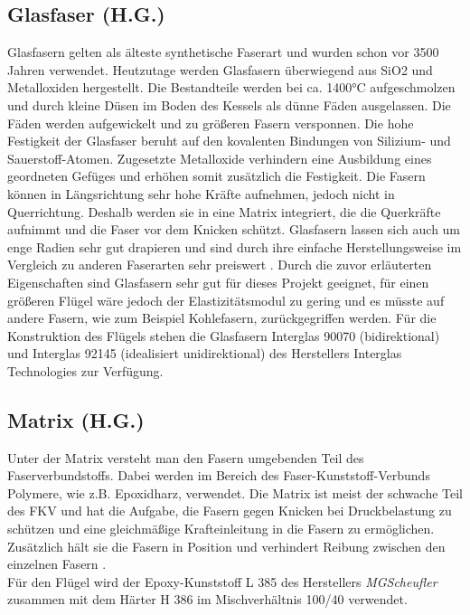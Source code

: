 \subsection{Glasfaser (H.G.)}
\label{Glasfaser}
Glasfasern gelten als älteste synthetische Faserart und wurden schon vor 3500 Jahren verwendet. Heutzutage werden Glasfasern überwiegend aus SiO2 und Metalloxiden hergestellt. Die Bestandteile werden bei ca. 1400°C aufgeschmolzen und durch kleine Düsen im Boden des Kessels als dünne Fäden ausgelassen. Die Fäden werden aufgewickelt und zu größeren Fasern versponnen\cite{item3}.
Die hohe Festigkeit der Glasfaser beruht auf den kovalenten Bindungen von Silizium- und Sauerstoff-Atomen. Zugesetzte Metalloxide verhindern eine Ausbildung eines geordneten Gefüges und erhöhen somit zusätzlich die Festigkeit. Die Fasern können in Längsrichtung sehr hohe Kräfte aufnehmen, jedoch nicht in Querrichtung. Deshalb werden sie in eine Matrix integriert, die die Querkräfte aufnimmt und die Faser vor dem Knicken schützt. Glasfasern lassen sich auch um enge Radien sehr gut drapieren und sind durch ihre einfache Herstellungsweise im Vergleich zu anderen Faserarten sehr preiswert \cite{item4}.
Durch die zuvor erläuterten Eigenschaften sind Glasfasern sehr gut für dieses Projekt geeignet, für einen größeren Flügel wäre jedoch der Elastizitätsmodul zu gering und es müsste auf andere Fasern, wie zum Beispiel Kohlefasern, zurückgegriffen werden. 
Für die Konstruktion des Flügels stehen die Glasfasern Interglas 90070 (bidirektional) und Interglas 92145 (idealisiert unidirektional) des Herstellers Interglas Technologies zur Verfügung. 

\subsection{Matrix (H.G.)}
Unter der Matrix versteht man den Fasern umgebenden Teil des Faserverbundstoffs. Dabei werden im Bereich des Faser-Kunststoff-Verbunds Polymere, wie z.B. Epoxidharz, verwendet. Die Matrix ist meist der schwache Teil des FKV und hat die Aufgabe, die Fasern gegen Knicken bei Druckbelastung zu schützen und eine gleichmäßige Krafteinleitung in die Fasern zu ermöglichen. Zusätzlich hält sie die Fasern in Position und verhindert Reibung zwischen den einzelnen Fasern \cite{item3}.\\
Für den Flügel wird der Epoxy-Kunststoff L 385 des Herstellers \textit{MGScheufler} zusammen mit dem Härter H 386 im Mischverhältnis 100/40 verwendet.
